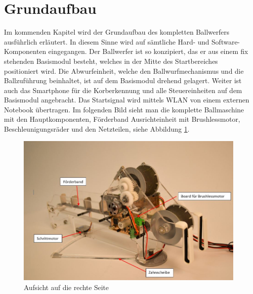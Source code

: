 \section{Grundaufbau}
	Im kommenden Kapitel wird der Grundaufbau des kompletten Ballwerfers ausführlich erläutert. 
	In diesem Sinne wird auf sämtliche Hard- und Software-Komponenten eingegangen.
    Der Ballwerfer ist so konzipiert, das er aus einem fix stehenden Basismodul besteht, 
    welches in der Mitte des Startbereiches positioniert wird. Die Abwurfeinheit, welche 
    den Ballwurfmechanismus und die Ballzuführung beinhaltet, ist auf dem Basismodul 
    drehend gelagert. Weiter ist auch das Smartphone für die Korberkennung und alle 
    Steuereinheiten auf dem Basismodul angebracht. Das Startsignal wird mittels WLAN 
    von einem externen Notebook übertragen. Im folgenden Bild sieht man die komplette Ballmaschine mit den Hauptkomponenten, Förderband
    Ausrichteinheit mit Brushlessmotor, Beschleunigungsräder und den Netzteilen, siehe 
    Abbildung \ref{abb:Ballmaschine}.
    \begin{figure}[h!]
    	\includegraphics[width=1\textwidth,clip,trim=0mm 0mm 0mm 20mm]
    	{Enddokumentation/Bilder/Geraeteuebersicht_2.jpg}
    	\centering
    	\caption{Aufsicht auf die rechte Seite}
    	\label{abb:Ballmaschine}
    \end{figure}
    
